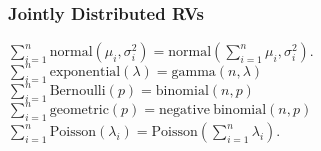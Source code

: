 \subsubsection*{Jointly Distributed RVs}
 $\sum^n_{i=1} \mathrm{normal}(\mu_i,\sigma^2_i) = \mathrm{normal}(\sum^n_{i=1}\mu_i,\sigma^2_i)$.
$\sum^n_{i=1} \mathrm{exponential}(\lambda) = \mathrm{gamma}(n,\lambda)$
$\sum^n_{i=1} \mathrm{Bernoulli}(p) = \mathrm{binomial}(n,p)$
$\sum^n_{i=1} \mathrm{geometric}(p) = \mathrm{negative\ binomial}(n,p)$
$\sum^n_{i=1} \mathrm{Poisson}(\lambda_i) = \mathrm{Poisson}(\sum^n_{i=1}\lambda_i)$.